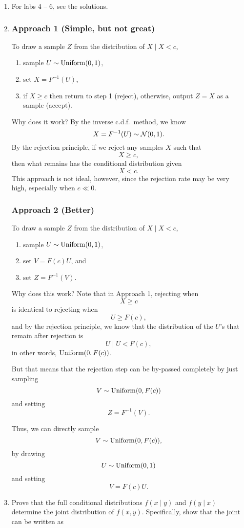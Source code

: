 \documentclass{article}
\begin{document}
\begin{enumerate}
\item For labs 4 -- 6, see the solutions. 

\item \subsubsection*{Approach 1 (Simple, but not great)}
To draw a sample $Z$ from the distribution of $X\mid X<c$,
\begin{enumerate}
    \item sample $U\sim \operatorname*{Uniform}(0,1)$,
    \item set $X = F^{-1}(U)$,
    \item if $X \geq c$ then return to step 1 (reject), otherwise, output $Z = X$ as a sample (accept).
\end{enumerate}
Why does it work? By the inverse c.d.f.\ method, we know $$X = F^{-1}(U)\sim\mathcal{N}(0,1).$$ By the rejection principle, if we reject any samples $X$
such that $$X\geq c,$$ then what remains has the conditional distribution given $$X<c.$$ This approach is not ideal, however, since the rejection rate may be very high, especially when $c\ll 0$.

\subsubsection*{Approach 2 (Better)}
To draw a sample $Z$ from the distribution of $X\mid X<c$,
\begin{enumerate}
    \item sample $U\sim \operatorname*{Uniform}(0,1)$,
    \item set $V = F(c)U$, and 
    \item set $Z = F^{-1}(V)$.
\end{enumerate}
Why does this work? Note that in Approach 1, rejecting when $$X\geq c$$ is identical to rejecting when $$U\geq F(c),$$ and by the rejection
principle, we know that the distribution of the $U$'s that remain after rejection is $$U\mid U<F(c),$$ in other words, $\operatorname*{Uniform}(0,F(c))$.  

But that means that the rejection step can be by-passed completely by just sampling $$V\sim\operatorname*{Uniform}(0,F(c))$$ and setting $$Z = F^{-1}(V).$$

Thus, we can directly sample $$V\sim\operatorname*{Uniform}(0,F(c)),$$ by drawing $$U\sim\operatorname*{Uniform}(0,1)$$ and setting $$V = F(c)U.$$ 

\item Prove that the full conditional distributions $f(x \mid y)$ and $f(y \mid x)$ determine the joint distribution of $f(x,y).$
Specifically, show that the joint can be written as


\end{enumerate}
\end{document}
